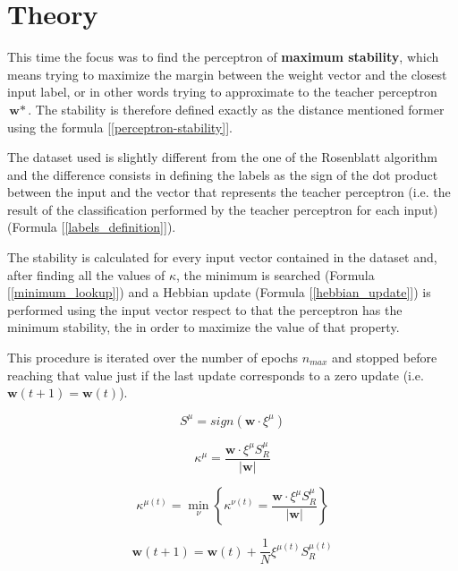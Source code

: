 \section{Theory}
\label{sec:theory}

This time the focus was to find the perceptron of \textbf{maximum stability}, which means trying to maximize the margin between the
weight vector and the closest input label, or in other words trying to approximate to the teacher perceptron $\mathsf{\textbf{w}}*$.
The stability is therefore defined exactly as the distance mentioned former using the formula [\ref{perceptron-stability}].

The dataset used is slightly different from the one of the Rosenblatt algorithm and the difference consists in defining the labels
as the sign of the dot product between the input and the vector that represents the teacher perceptron (i.e. the result of the
classification performed by the teacher perceptron for each input) (Formula [\ref{labels_definition}]). 

The stability is calculated for every input vector contained in the dataset and, after finding all the values of $\kappa$,
the minimum is searched (Formula [\ref{minimum_lookup}]) and a Hebbian update (Formula [\ref{hebbian_update}]) is performed using the input vector
respect to that the perceptron has the minimum stability, the in order to maximize the value of that property.

This procedure is iterated over the number of epochs $n_{max}$ and stopped before reaching that value just if the last update
corresponds to a zero update (i.e. $\mathsf{\bm{w}}(t+1) = \mathsf{\bm{w}}(t)$). 

\begin{equation} \label{labels_definition}
    S^\mu = sign(\mathsf{\bm{w}} \cdotp \xi^\mu)
\end{equation}

\begin{equation} \label{perceptron-stability}
    \kappa^\mu = \frac{\mathsf{\bm{w}} \cdotp \xi^\mu S^\mu_R}{\lvert \mathsf{\bm{w}} \rvert}
\end{equation}

\begin{equation} \label{minimum_lookup}
    \kappa^{\mu(t)} = \min_\nu \left \{ \kappa^{\nu(t)} =  \frac{\mathsf{\bm{w}} \cdotp \xi^\mu S^\mu_R}{\lvert \mathsf{\bm{w}} \rvert} \right \}
\end{equation}

\begin{equation} \label{hebbian_update}
    \mathsf{\bm{w}}(t+1) = \mathsf{\bm{w}}(t) + \frac{1}{N} \xi^{\mu(t)} S^{\mu(t)}_R
\end{equation}